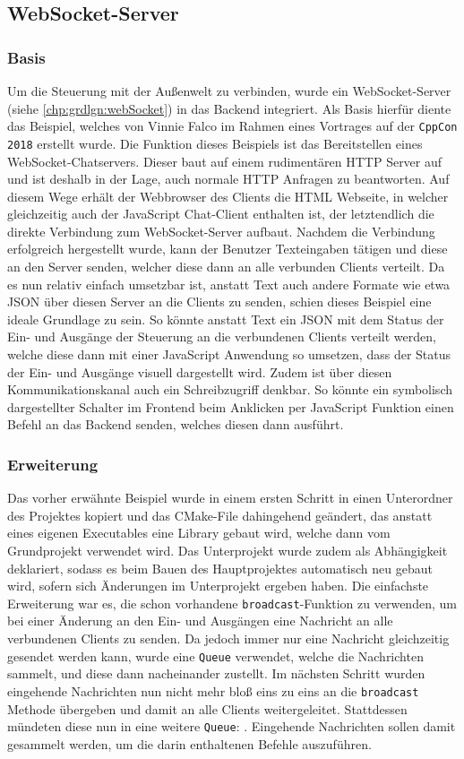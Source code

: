 \subsection{WebSocket-Server}\label{chp:ums:websockserver}
\subsubsection{Basis}
Um die Steuerung mit der Außenwelt zu verbinden, wurde ein WebSocket-Server (siehe \ref{chp:grdlgn:webSocket}) in das Backend integriert. Als Basis hierfür diente das Beispiel, welches von Vinnie Falco im  Rahmen eines Vortrages auf der \texttt{CppCon 2018} erstellt wurde. \cite{URL:WebSocketCppCon} Die Funktion dieses Beispiels ist das Bereitstellen eines WebSocket-Chatservers. Dieser baut auf einem rudimentären HTTP Server auf und ist deshalb in der Lage, auch normale HTTP Anfragen zu beantworten. Auf diesem Wege erhält der Webbrowser des Clients die HTML Webseite, in welcher gleichzeitig auch der JavaScript Chat-Client enthalten ist, der letztendlich die direkte Verbindung zum WebSocket-Server aufbaut. Nachdem die Verbindung erfolgreich hergestellt wurde, kann der Benutzer Texteingaben tätigen und diese an den Server senden, welcher diese dann an alle verbunden Clients verteilt. Da es nun relativ einfach umsetzbar ist, anstatt Text auch andere Formate wie etwa JSON über diesen Server an die Clients zu senden, schien dieses Beispiel eine ideale Grundlage zu sein. So könnte anstatt Text ein JSON mit dem Status der Ein- und Ausgänge der Steuerung an die verbundenen Clients verteilt werden, welche diese dann mit einer JavaScript Anwendung so umsetzen, dass der Status der Ein- und Ausgänge visuell dargestellt wird. Zudem ist über diesen Kommunikationskanal auch ein Schreibzugriff denkbar. So könnte ein symbolisch dargestellter Schalter im Frontend beim Anklicken per JavaScript Funktion einen Befehl an das Backend senden, welches diesen dann ausführt. 
\subsubsection{Erweiterung}
Das vorher erwähnte Beispiel wurde in einem ersten Schritt in einen Unterordner des Projektes kopiert und das CMake-File dahingehend geändert, das anstatt eines eigenen Executables eine Library gebaut wird, welche dann vom Grundprojekt verwendet wird. Das Unterprojekt wurde zudem als Abhängigkeit deklariert, sodass es beim Bauen des Hauptprojektes automatisch neu gebaut wird, sofern sich Änderungen im Unterprojekt ergeben haben. Die einfachste Erweiterung war es, die schon vorhandene \texttt{broadcast}-Funktion zu verwenden, um bei einer Änderung an den Ein- und Ausgängen eine Nachricht an alle verbundenen Clients zu senden. Da jedoch immer nur eine Nachricht gleichzeitig gesendet werden kann, wurde eine \texttt{Queue} verwendet, welche die Nachrichten sammelt, und diese dann nacheinander zustellt. Im nächsten Schritt wurden eingehende Nachrichten nun nicht mehr bloß eins zu eins an die \texttt{broadcast} Methode übergeben und damit an alle Clients weitergeleitet. Stattdessen mündeten diese nun in eine weitere \texttt{Queue}: . Eingehende Nachrichten sollen damit gesammelt werden, um die darin enthaltenen Befehle auszuführen.
